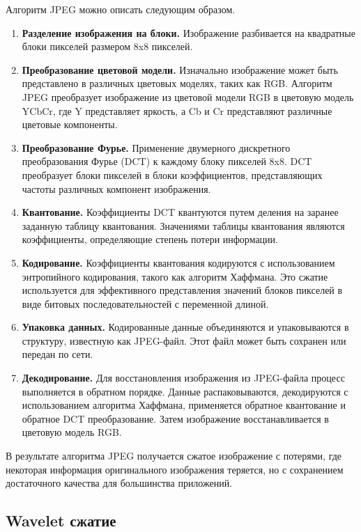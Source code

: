Алгоритм JPEG можно описать следующим образом.
\begin{enumerate}
    \item \textbf{Разделение изображения на блоки.} Изображение разбивается на квадратные блоки пикселей размером 8x8 пикселей.
    \item \textbf{Преобразование цветовой модели.} Изначально изображение может быть представлено в различных цветовых моделях, таких как RGB. Алгоритм JPEG преобразует изображение из цветовой модели RGB в цветовую модель YCbCr, где Y представляет яркость, а Cb и Cr представляют различные цветовые компоненты.
    \item \textbf{Преобразование Фурье.} Применение двумерного дискретного преобразования Фурье (DCT) к каждому блоку пикселей 8x8. DCT преобразует блоки пикселей в блоки коэффициентов, представляющих частоты различных компонент изображения.
    \item \textbf{Квантование.} Коэффициенты DCT квантуются путем деления на заранее заданную таблицу квантования. Значениями таблицы квантования являются коэффициенты, определяющие степень потери информации.
    \item \textbf{Кодирование.} Коэффициенты квантования кодируются с использованием энтропийного кодирования, такого как алгоритм Хаффмана. Это сжатие используется для эффективного представления значений блоков пикселей в виде битовых последовательностей с переменной длиной.
    \item \textbf{Упаковка данных.} Кодированные данные объединяются и упаковываются в структуру, известную как JPEG-файл. Этот файл может быть сохранен или передан по сети.
    \item \textbf{Декодирование.} Для восстановления изображения из JPEG-файла процесс выполняется в обратном порядке. Данные распаковываются, декодируются с использованием алгоритма Хаффмана, применяется обратное квантование и обратное DCT преобразование. Затем изображение восстанавливается в цветовую модель RGB.
\end{enumerate}

В результате алгоритма JPEG получается сжатое изображение с потерями, где некоторая информация оригинального изображения теряется, но с сохранением достаточного качества для большинства приложений.

\subsection{Wavelet сжатие}

